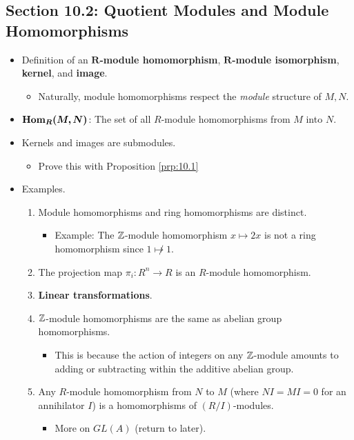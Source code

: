 \documentclass[../notes.tex]{subfiles}
\begin{document}
\subsection*{Section 10.2: Quotient Modules and Module Homomorphisms}
\begin{itemize}
    \item Definition of an \textbf{$\bm{R}$-module homomorphism}, \textbf{$\bm{R}$-module isomorphism}, \textbf{kernel}, and \textbf{image}.
    \begin{itemize}
        \item Naturally, module homomorphisms respect the \emph{module} structure of $M,N$.
    \end{itemize}
    \item $\bm{\Hom_R(M,N)}$: The set of all $R$-module homomorphisms from $M$ into $N$.
    \item Kernels and images are submodules.
    \begin{itemize}
        \item Prove this with Proposition \ref{prp:10.1}
    \end{itemize}
    \item Examples.
    \begin{enumerate}
        \item Module homomorphisms and ring homomorphisms are distinct.
        \begin{itemize}
            \item Example: The $\mathbb{Z}$-module homomorphism $x\mapsto 2x$ is not a ring homomorphism since $1\not\mapsto 1$.
        \end{itemize}
        \item The projection map $\pi_i:R^n\to R$ is an $R$-module homomorphism.
        \item \textbf{Linear transformations}.
        \item $\mathbb{Z}$-module homomorphisms are the same as abelian group homomorphisms.
        \begin{itemize}
            \item This is because the action of integers on any $\mathbb{Z}$-module amounts to adding or subtracting within the additive abelian group.
        \end{itemize}
        \item Any $R$-module homomorphism from $N$ to $M$ (where $NI=MI=0$ for an annihilator $I$) is a homomorphisms of $(R/I)$-modules.
        \begin{itemize}
            \item More on $GL(A)$ (return to later).

\end{itemize}
\end{enumerate}
\end{itemize}
\end{document}
